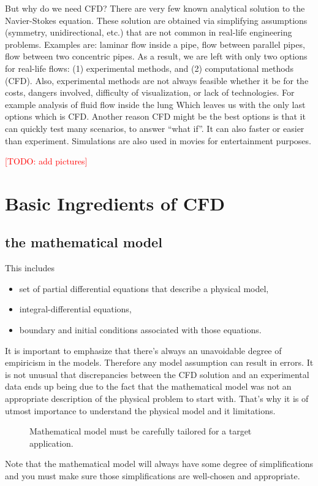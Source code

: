 But why do we need CFD?
There are very few known analytical solution to the Navier-Stokes equation.
These solution are obtained via simplifying assumptions (symmetry, unidirectional, etc.) that are not common in real-life engineering problems.
Examples are: laminar flow inside a pipe, flow between parallel pipes, flow between two concentric pipes.
As a result, we are left with only two options for real-life flows: (1) experimental methods, and (2) computational methods (CFD).
Also, experimental methods are not always feasible whether it be for the costs, dangers involved, difficulty of visualization, or lack of technologies.
For example analysis of fluid flow inside the lung
Which leaves us with the only last options which is CFD.
Another reason CFD might be the best options is that it can quickly test many scenarios, to answer ``what if''.
It can also faster or easier than experiment.
Simulations are also used in movies for entertainment purposes.

\textcolor{red}{[TODO: add pictures]}

\section{Basic Ingredients of CFD}


\subsection{the mathematical model}

This includes
\begin{itemize}
  \item set of partial differential equations that describe a physical model,
  \item integral-differential equations,
  \item boundary and initial conditions associated with those equations.
\end{itemize}
%
It is important to emphasize that there's always an unavoidable degree of empiricism in the models.
Therefore any model assumption can result in errors.
It is not unusual that discrepancies between the CFD solution and an experimental data ends up being due to the fact that the mathematical model was not an appropriate description of the physical problem to start with.
That's why it is of utmost importance to understand the physical model and it limitations.
%
\begin{figure}[ht]
  \begin{center}
  \end{center}
  \caption{Mathematical model must be carefully tailored for a target application.}\label{fig:ingredients-model}
\end{figure}
%
Note that the mathematical model will always have some degree of simplifications and you must make sure those simplifications are well-chosen and appropriate.

